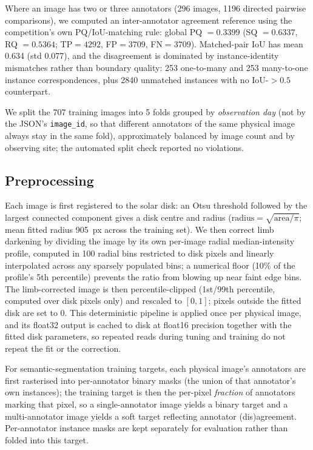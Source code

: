 \documentclass[sigconf]{acmart}
\begin{document}
    Where an image has two or three annotators (296 images, 1196 directed pairwise comparisons), we computed an inter-annotator agreement reference using the competition's own PQ/IoU-matching rule: global PQ $=0.3399$ (SQ $=0.6337$, RQ $=0.5364$; TP$=4292$, FP$=3709$, FN$=3709$). Matched-pair IoU has mean 0.634 (std 0.077), and the disagreement is dominated by instance-identity mismatches rather than boundary quality: 253 one-to-many and 253 many-to-one instance correspondences, plus 2840 unmatched instances with no IoU-$>0.5$ counterpart.

    We split the 707 training images into 5 folds grouped by \emph{observation day} (not by the JSON's \texttt{image\_id}, so that different annotators of the same physical image always stay in the same fold), approximately balanced by image count and by observing site; the automated split check reported no violations.

\subsection{Preprocessing}\label{sec:preprocessing}
    Each image is first registered to the solar disk: an Otsu threshold followed by the largest connected component gives a disk centre and radius ($\text{radius}=\sqrt{\text{area}/\pi}$; mean fitted radius 905~px across the training set). We then correct limb darkening by dividing the image by its own per-image radial median-intensity profile, computed in 100 radial bins restricted to disk pixels and linearly interpolated across any sparsely populated bins; a numerical floor (10\% of the profile's 5th percentile) prevents the ratio from blowing up near faint edge bins. The limb-corrected image is then percentile-clipped (1st/99th percentile, computed over disk pixels only) and rescaled to $[0,1]$; pixels outside the fitted disk are set to 0. This deterministic pipeline is applied once per physical image, and its float32 output is cached to disk at float16 precision together with the fitted disk parameters, so repeated reads during tuning and training do not repeat the fit or the correction.

    For semantic-segmentation training targets, each physical image's annotators are first rasterised into per-annotator binary masks (the union of that annotator's own instances); the training target is then the per-pixel \emph{fraction} of annotators marking that pixel, so a single-annotator image yields a binary target and a multi-annotator image yields a soft target reflecting annotator (dis)agreement. Per-annotator instance masks are kept separately for evaluation rather than folded into this target.
\end{document}
